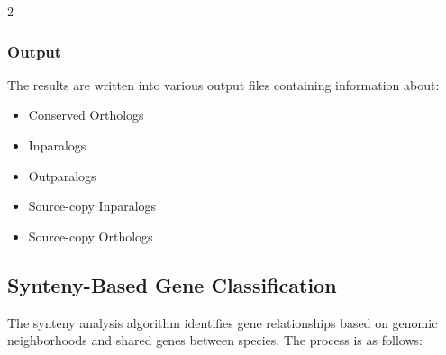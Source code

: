 2\documentclass{article}
\begin{document}
\subsubsection{Output}
The results are written into various output files containing information about:
\begin{itemize}
    \item Conserved Orthologs
    \item Inparalogs
    \item Outparalogs
    \item Source-copy Inparalogs
    \item Source-copy Orthologs
\end{itemize}

\subsection{Synteny-Based Gene Classification}
The synteny analysis algorithm identifies gene relationships based on genomic neighborhoods and shared genes between species. The process is as follows:
\end{document}
